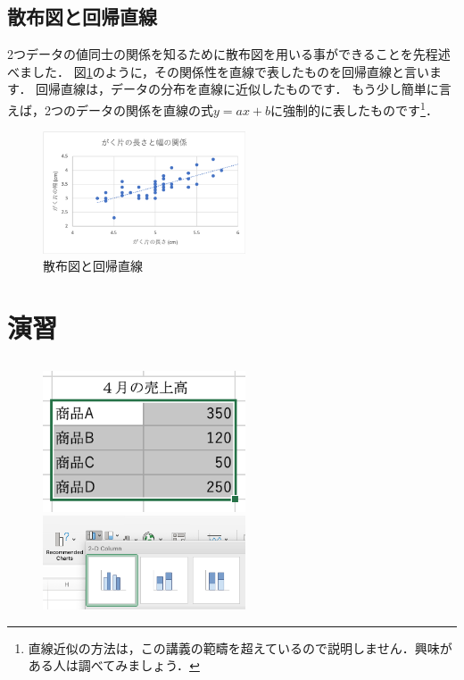 \subsection{散布図と回帰直線}

2つデータの値同士の関係を知るために散布図を用いる事ができることを先程述べました．
図\ref{fig:regression}のように，その関係性を直線で表したものを回帰直線と言います．
回帰直線は，データの分布を直線に近似したものです．
もう少し簡単に言えば，2つのデータの関係を直線の式$y=ax+b$に強制的に表したものです\footnote{直線近似の方法は，この講義の範疇を超えているので説明しません．興味がある人は調べてみましょう．}．

\begin{figure}[htbp]
    \centering
    \includegraphics[width=6cm]{chap2/regression.png}
    \caption{散布図と回帰直線}
    \label{fig:regression}
\end{figure}

\section{演習}

\subsection{}


\begin{figure}[tb]
    \begin{minipage}{0.5\hsize}
        \centering
        \includegraphics[width=6cm]{chap2/bar1.png}
        \caption{}
        \label{fig:bar1}
    \end{minipage}
    \begin{minipage}{0.5\hsize}
        \centering
        \includegraphics[width=6cm]{chap2/bar2.png}
        \caption{}
        \label{fig:bar2}
    \end{minipage}
\end{figure}



